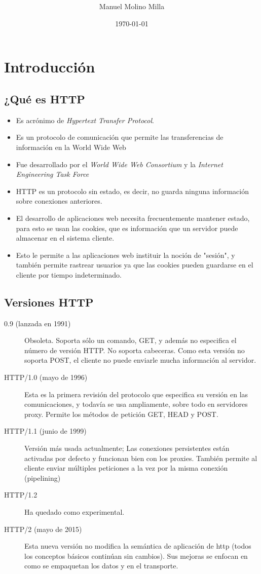 \documentclass[4paper]{article}
\author{Manuel Molino Milla}
\title{\textbf{\HT}}
\date{\today}
\newcommand{\HT}{HTTP}
\begin{document}
\maketitle 
\tableofcontents
\newpage

\section{Introducción}
\subsection{¿Qué es \HT}
\begin{itemize}
\item Es acrónimo de \emph{Hypertext Transfer Protocol}.
\item Es un protocolo de comunicación que permite las transferencias de información en la World Wide Web
\item Fue desarrollado por el \emph{World Wide Web Consortium} y la \emph{Internet Engineering Task Force}
\item  HTTP es un protocolo sin estado, es decir, no guarda ninguna información sobre conexiones anteriores. 
\item El desarrollo de aplicaciones web necesita frecuentemente mantener estado, para esto se usan las cookies, que es información que un servidor puede almacenar en el sistema cliente. 
\item Esto le permite a las aplicaciones web instituir la noción de "sesión", y también permite rastrear usuarios ya que las cookies pueden guardarse en el cliente por tiempo indeterminado.
\end{itemize}
\subsection{Versiones \HT}
\begin{description}
\item[0.9 (lanzada en 1991)] Obsoleta. Soporta sólo un comando, GET, y además no especifica el número de versión HTTP. No soporta cabeceras. Como esta versión no soporta POST, el cliente no puede enviarle mucha información al servidor.
\item[HTTP/1.0 (mayo de 1996)] Esta es la primera revisión del protocolo que especifica su versión en las comunicaciones, y todavía se usa ampliamente, sobre todo en servidores proxy. Permite los métodos de petición GET, HEAD y POST.
\item[HTTP/1.1 (junio de 1999)] Versión más usada actualmente; Las conexiones persistentes están activadas por defecto y funcionan bien con los proxies. También permite al cliente enviar múltiples peticiones a la vez por la misma conexión (pipelining)
\item[HTTP/1.2] Ha quedado como experimental.
\item[HTTP/2 (mayo de 2015)] Esta nueva versión no modifica la semántica de aplicación de http (todos los conceptos básicos continúan sin cambios). Sus mejoras se enfocan en como se empaquetan los datos y en el transporte.
\end{description}
\end{document}
